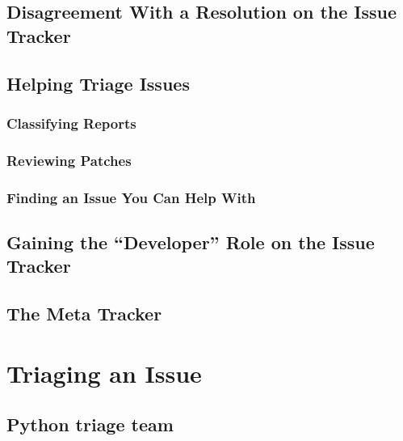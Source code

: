 \documentclass[]{book}
\begin{document}
\hypertarget{disagreement-with-a-resolution-on-the-issue-tracker}{%
\section{Disagreement With a Resolution on the Issue Tracker}\label{disagreement-with-a-resolution-on-the-issue-tracker}}

\hypertarget{helping-triage-issues}{%
\section{Helping Triage Issues}\label{helping-triage-issues}}

\hypertarget{classifying-reports}{%
\subsection{Classifying Reports}\label{classifying-reports}}

\hypertarget{reviewing-patches}{%
\subsection{Reviewing Patches}\label{reviewing-patches}}

\hypertarget{finding-an-issue-you-can-help-with}{%
\subsection{Finding an Issue You Can Help With}\label{finding-an-issue-you-can-help-with}}

\hypertarget{gaining-the-developer-role-on-the-issue-tracker}{%
\section{Gaining the ``Developer'' Role on the Issue Tracker}\label{gaining-the-developer-role-on-the-issue-tracker}}

\hypertarget{the-meta-tracker}{%
\section{The Meta Tracker}\label{the-meta-tracker}}

\hypertarget{triaging-an-issue}{%
\chapter{Triaging an Issue}\label{triaging-an-issue}}

\hypertarget{python-triage-team}{%
\section{Python triage team}\label{python-triage-team}}
\end{document}
